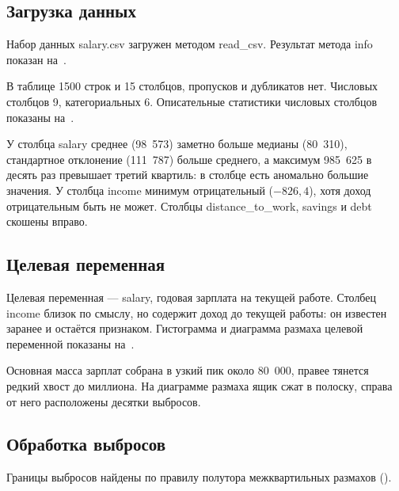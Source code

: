 \documentclass[a4paper,14pt]{extarticle}
\begin{document}
\subsection{Загрузка данных}

Набор данных salary.csv загружен методом read\_csv. Результат метода info показан на~.


В таблице 1500 строк и 15 столбцов, пропусков и дубликатов нет. Числовых столбцов 9, категориальных 6. Описательные статистики числовых столбцов показаны на~.


У столбца salary среднее (98~573) заметно больше медианы (80~310), стандартное отклонение (111~787) больше среднего, а максимум 985~625 в десять раз превышает третий квартиль: в столбце есть аномально большие значения. У столбца income минимум отрицательный ($-826{,}4$), хотя доход отрицательным быть не может. Столбцы distance\_to\_work, savings и debt скошены вправо.

\subsection{Целевая переменная}

Целевая переменная — salary, годовая зарплата на текущей работе. Столбец income близок по смыслу, но содержит доход до текущей работы: он известен заранее и остаётся признаком. Гистограмма и диаграмма размаха целевой переменной показаны на~.


Основная масса зарплат собрана в узкий пик около 80~000, правее тянется редкий хвост до миллиона. На диаграмме размаха ящик сжат в полоску, справа от него расположены десятки выбросов.

\subsection{Обработка выбросов}

Границы выбросов найдены по правилу полутора межквартильных размахов ().

\end{document}
